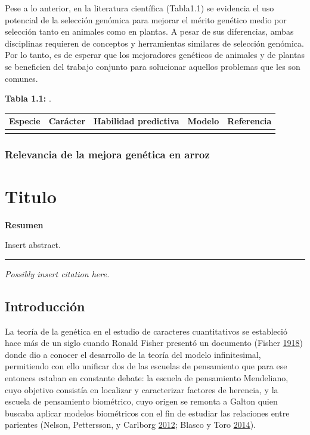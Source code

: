 \documentclass[11pt,spanish,a4paper,oneside,]{book} %
\begin{document}
Pese a lo anterior, en la literatura científica (Tabla1.1) se evidencia el uso potencial de la selección genómica para mejorar el mérito genético medio por selección tanto en animales como en plantas. A pesar de sus diferencias, ambas disciplinas requieren de conceptos y herramientas similares de selección genómica. Por lo tanto, es de esperar que los mejoradores genéticos de animales y de plantas se beneficien del trabajo conjunto para solucionar aquellos problemas que les son comunes.

\begin{center}
\textbf{Tabla 1.1:} .

\end{center}

\captionsetup[table]{labelformat=empty,skip=1pt}
\begin{longtable}{lllll}
\toprule
Especie & Carácter & Habilidad predictiva & Modelo & Referencia \\ 
\midrule
 &  &  &  &  \\ 
 \bottomrule
\end{longtable}

\hypertarget{relevancia-de-la-mejora-genuxe9tica-en-arroz}{%
\subsection{Relevancia de la mejora genética en arroz}\label{relevancia-de-la-mejora-genuxe9tica-en-arroz}}

\hypertarget{titulo}{%
\chapter{Titulo}\label{titulo}}

\textbf{Resumen}

\noindent 
Insert abstract.

\begin{center}\rule{0.5\linewidth}{0.5pt}\end{center}

\vspace*{\fill}

\noindent
\emph{Possibly insert citation here.}
\newpage

\hypertarget{intro2}{%
\section{Introducción}\label{intro2}}

La teoría de la genética en el estudio de caracteres cuantitativos se estableció hace más de un siglo cuando Ronald Fisher presentó un documento (Fisher \protect\hyperlink{ref-cite:1}{1918}) donde dio a conocer el desarrollo de la teoría del modelo infinitesimal, permitiendo con ello unificar dos de las escuelas de pensamiento que para ese entonces estaban en constante debate: la escuela de pensamiento Mendeliano, cuyo objetivo consistía en localizar y caracterizar factores de herencia, y la escuela de pensamiento biométrico, cuyo origen se remonta a Galton quien buscaba aplicar modelos biométricos con el fin de estudiar las relaciones entre parientes (Nelson, Pettersson, y Carlborg \protect\hyperlink{ref-cite:2}{2012}; Blasco y Toro \protect\hyperlink{ref-cite:3}{2014}).
\end{document}
